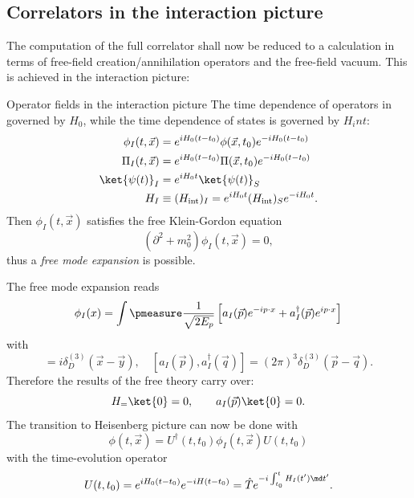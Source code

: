 \subsection{Correlators in the interaction picture}
The computation of the full correlator shall now be reduced to a calculation in terms of free-field creation/annihilation operators and the free-field vacuum. This is achieved in the interaction picture: 
\begin{mybox}{Operator fields in the interaction picture}
	The time dependence of operators in governed by $H_0$, while the time dependence of states is governed by $H_int$:
	\begin{align}
		\phi_I(t,\vec{x}) &= e^{i H_0 (t-t_0)} \phi(\vec{x},t_0) e^{-i H_0 (t-t_0)} \\
		\Pi_I(t,\vec{x}) &= e^{i H_0 (t-t_0)} \Pi(\vec{x},t_0) e^{-i H_0 (t-t_0)} \\
		\ket{\psi(t)}_I &= e^{i H_0 t} \ket{\psi(t)}_S \\
		H_I &\equiv (H_{\mathrm{int}})_I = e^{i H_0 t} (H_{\mathrm{int}})_S e^{-i H_0 t}.
	\end{align}
	Then $\phi_I(t,\vec{x})$ satisfies the free Klein-Gordon equation
	\begin{equation}
	(\partial^2+m^2_0) \phi_I(t,\vec{x}) = 0,
	\end{equation}
	thus a \emph{free mode expansion} is possible.
\end{mybox}
The free mode expansion reads
\begin{equation}
\phi_I(x) = \int \pmeasure \frac{1}{\sqrt{2 E_p}} \left[a_I(\vec{p}) e^{-i p\cdot x} + a^{\dagger}_I(\vec{p}) e^{i p\cdot x} \right]
\end{equation}
with
\begin{equation}
[\phi_I(t,\vec{x}), \Pi_I(t,\vec{y})]=i \delta^{(3)}_D(\vec{x}-\vec{y}), \quad [a_I(\vec{p}),a^{\dagger}_I(\vec{q})] = (2 \pi)^3 \delta^{(3)}_D(\vec{p}-\vec{q}).
\end{equation}
Therefore the results of the free theory carry over:
\begin{equation}
H_= \ket{0}=0, \qquad a_I(\vec{p})\ket{0}=0.
\end{equation}
The transition to Heisenberg picture can now be done with
\begin{equation}
\phi(t,\vec{x}) = U^{\dagger}(t,t_0)  \phi_I(t,\vec{x}) U(t,t_0)
\end{equation}
with the time-evolution operator
\begin{equation}
U(t,t_0) = e^{i H_0(t-t_0)} e^{-i H(t-t_0)} = \hat{T}e^{-i \int_{t_0}^{t} H_I(t') \md t'}.
\end{equation}
